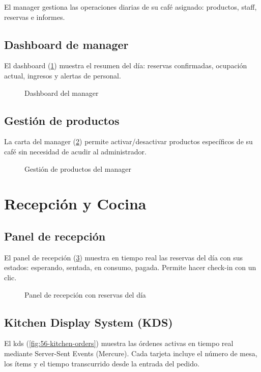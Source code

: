 \documentclass[12pt,a4paper,twoside,openright]{report}
\begin{document}
El manager gestiona las operaciones diarias de su café asignado: productos,
staff, reservas e informes.

\subsection{Dashboard de manager}
El dashboard (\cref{fig:49-manager-dashboard}) muestra el resumen del día:
reservas confirmadas, ocupación actual, ingresos y alertas de personal.

\begin{figure}[H]
  \centering
  \fbox{\rule{0pt}{6cm}\rule{12cm}{0pt}}
  \caption{Dashboard del manager}
  \label{fig:49-manager-dashboard}
\end{figure}

\subsection{Gestión de productos}
La carta del manager (\cref{fig:50-manager-productos}) permite activar/desactivar
productos específicos de su café sin necesidad de acudir al administrador.

\begin{figure}[H]
  \centering
  \fbox{\rule{0pt}{6cm}\rule{12cm}{0pt}}
  \caption{Gestión de productos del manager}
  \label{fig:50-manager-productos}
\end{figure}

\section{Recepción y Cocina}
\label{sec:manual-ops}

\subsection{Panel de recepción}
El panel de recepción (\cref{fig:54-reception-dashboard}) muestra en tiempo real
las reservas del día con sus estados: esperando, sentada, en consumo, pagada.
Permite hacer check-in con un clic.

\begin{figure}[H]
  \centering
  \fbox{\rule{0pt}{6cm}\rule{12cm}{0pt}}
  \caption{Panel de recepción con reservas del día}
  \label{fig:54-reception-dashboard}
\end{figure}

\subsection{Kitchen Display System (KDS)}
El \gls{kds} (\cref{fig:56-kitchen-orders}) muestra las órdenes activas en tiempo
real mediante Server-Sent Events (Mercure). Cada tarjeta incluye el número de mesa,
los ítems y el tiempo transcurrido desde la entrada del pedido.
\end{document}
